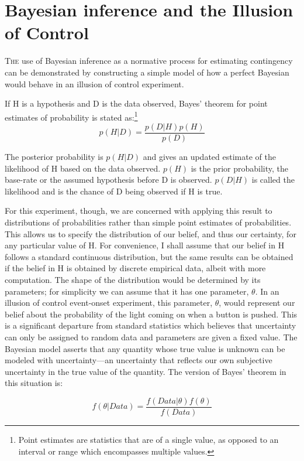 \documentclass[USenglish,letterpaper,12pt,extrafontsizes,oneside,onecolumn,final]{memoir}
\begin{document}
\section{Bayesian inference and the Illusion of Control}
\lettrine[lines=2,slope=-3pt,nindent=2pt]{T}{he} use of Bayesian inference as a normative process for estimating contingency can be demonstrated  by constructing a simple model of how a perfect Bayesian would behave in an illusion of control experiment.

If H is a hypothesis and D is the data observed, Bayes' theorem for point estimates of probability is stated as:\footnote{Point estimates are statistics that are of a single value, as opposed to an interval or range which encompasses multiple values.}
\begin{equation}
p(H|D) = \frac{p(D|H)p(H)}{p(D)}
\end{equation}

The posterior probability is $p(H|D)$ and gives an updated estimate of the likelihood of H based on the data observed.  $p(H)$ is the prior probability, the base-rate or the assumed hypothesis before D is observed.  $p(D|H)$ is called the likelihood and is the chance of D being observed if H is true.

For this experiment, though, we are concerned with applying this result to distributions of probabilities rather than simple point estimates of probabilities. This allows us to specify the distribution of our belief, and thus our certainty, for any particular value of H.  For convenience, I shall assume that our belief in H follows a standard continuous distribution, but the same results can be obtained if the belief in H is obtained by discrete empirical data, albeit with more computation.  The shape of the distribution would be determined by its parameters; for simplicity we can assume that it has one parameter, $\theta$.  In an illusion of control event-onset experiment, this parameter, $\theta$, would represent our belief about the probability of the light coming on when a button is pushed. This is a significant departure from standard statistics which believes that uncertainty can only be assigned to random data and parameters are given a fixed value.  The Bayesian model asserts that any quantity whose true value is unknown can be modeled with uncertainty---an uncertainty that reflects our own subjective uncertainty in the true value of the quantity.  The version of Bayes' theorem in this situation is:

\begin{equation}
f(\theta|Data) = \frac{f(Data|\theta)f(\theta)}{f(Data)} 
\label{eq:bayes for distributions}
\end{equation}
\end{document}
